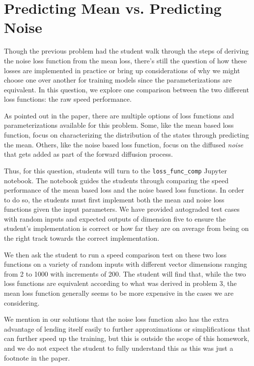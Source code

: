 \documentclass{article}
\begin{document}
\section{Predicting Mean vs. Predicting Noise}

Though the previous problem had the student walk through the steps of deriving the noise loss function from the mean loss, there's still the question of how these losses are implemented in practice or bring up considerations of why we might choose one over another for training models since the parameterizations are equivalent. In this question, we explore one comparison between the two different loss functions: the raw speed performance.

As pointed out in the paper, there are multiple options of loss functions and parameterizations available for this problem.
Some, like the mean based loss function, focus on characterizing the distribution of the states through predicting the mean.
Others, like the noise based loss function, focus on the diffused \textit{noise} that gets added as part of the forward diffusion process.

Thus, for this question, students will turn to the \verb|loss_func_comp| Jupyter notebook. The notebook guides the students through comparing the speed performance of the mean based loss and the noise based loss functions. In order to do so, the students must first implement both the mean and noise loss functions given the input parameters. We have provided autograded test cases with random inputs and expected outputs of dimension five to ensure the student's implementation is correct or how far they are on average from being on the right track towards the correct implementation.

We then ask the student to run a speed comparison test on these two loss functions on a variety of random inputs with different vector dimensions ranging from 2 to 1000 with increments of 200. The student will find that, while the two loss functions are equivalent according to what was derived in problem 3, the mean loss function generally seems to be more expensive in the cases we are considering.

We mention in our solutions that the noise loss function also has the extra advantage of lending itself easily to further approximations or simplifications that can further speed up the training, but this is outside the scope of this homework, and we do not expect the student to fully understand this as this was just a footnote in the paper.
\end{document}
